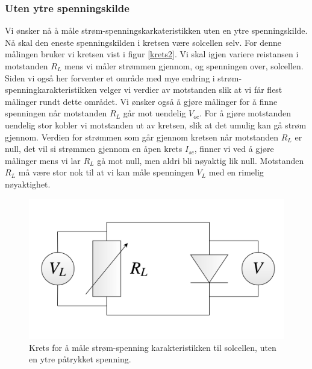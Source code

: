 \documentclass[%
 reprint,
 amsmath,amssymb,
 aps,
 norsk,
 booktabs
]{revtex4-1}
\begin{document}
\subsubsection{Uten ytre spenningskilde}
Vi ønsker nå å måle strøm-spenningskarkateristikken uten en ytre spenningskilde. Nå skal den eneste spenningskilden i kretsen være solcellen selv. For denne målingen bruker vi kretsen vist i figur \vref{krets2}. Vi skal igjen variere reistansen i motstanden $R_L$ mens vi måler strømmen gjennom, og spenningen over, solcellen. Siden vi også her forventer et område med mye endring i strøm-spenningkarakteristikken velger vi verdier av motstanden slik at vi får flest målinger rundt dette området. Vi ønsker også å gjøre målinger for å finne spenningen når motstanden $R_L$ går mot uendelig $V_{oc}$. For å gjøre motstanden uendelig stor kobler vi motstanden ut av kretsen, slik at det umulig kan gå strøm gjennom. Verdien for strømmen som går gjennom kretsen når motstanden $R_L$ er null, det vil si strømmen gjennom en åpen krets $I_{sc}$, finner vi ved å gjøre målinger mens vi lar $R_L$ gå mot null, men aldri bli nøyaktig lik null. Motstanden $R_L$ må være stor nok til at vi kan måle spenningen $V_L$ med en rimelig nøyaktighet.
\begin{figure}[h!]
  \centering
  \includegraphics[scale=0.19]{krets2.png}
  \caption{Krets for å måle strøm-spenning karakteristikken til solcellen, uten en ytre påtrykket spenning.}
  \label{krets2}
\end{figure}
\end{document}
